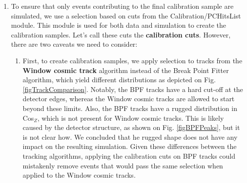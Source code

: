 \begin{enumerate}
\item To ensure that only events contributing to the final calibration sample are simulated, we use a selection based on cuts from the Calibration/PCHitsList module. This module is used for both data and simulation to create the calibration samples. Let's call these cuts the \textbf{calibration cuts}. However, there are two caveats we need to consider:
\begin{enumerate}
\item First, to create calibration samples, we apply selection to tracks from the \textbf{Window cosmic track} algorithm instead of the Break Point Fitter algorithm, which yield different distributions as depicted on Fig. \ref{figTrackComparison}. Notably, the BPF tracks have a hard cut-off at the detector edges, whereas the Window cosmic tracks are allowed to start beyond these limits. Also, the BPF tracks have a rugged distribution in Cos$_Z$, which is not present for Window cosmic tracks. This is likely caused by the detector structure, as shown on Fig. \ref{figBPFPeaks}, but it is not clear how. We concluded that he rugged shape does not have any impact on the resulting simulation. Given these differences between the tracking algorithms, applying the calibration cuts on BPF tracks could mistakenly remove events that would pass the same selection when applied to the Window cosmic tracks.

\begin{figure}[!ht]
\centering
{}


\end{figure}
\end{enumerate}
\end{enumerate}
